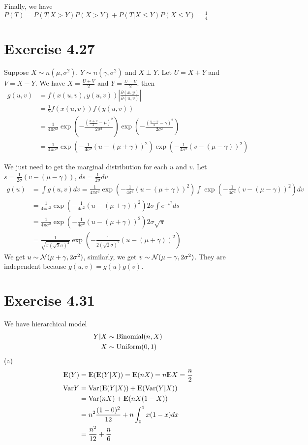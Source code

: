 \documentclass[12pt]{article}
\begin{document}
Finally, we have $P(T) = P(T | X > Y) P(X > Y) + P(T | X \leq Y) P( X \leq Y) = \frac{1}{4}$

\section*{Exercise 4.27}
Suppose $X \sim n(\mu, \sigma^2)$,  $Y \sim n(\gamma, \sigma^2)$ and $X \perp Y$.  Let $U = X + Y$ and $V = X - Y$. We have $X = \frac{U + V}{2}$ and $Y = \frac{U - V}{2}$. then $$\begin{aligned}
g(u, v) &= f(x(u, v), y(u, v)) \left|\frac{\partial(x,y)}{\partial(u,v)}\right| \\
&= \frac{1}{2} f(x(u, v))f(y(u, v))  \\
&= \frac{1}{4\pi \sigma^2} \exp(-\frac{(\frac{u + v}{2} - \mu)^2}{2\sigma^2})\exp(-\frac{(\frac{u - v}{2} - \gamma)^2}{2\sigma^2}) \\
&= \frac{1}{4\pi \sigma^2} \exp(-\frac{1}{4 \sigma^2}(u -(\mu + \gamma))^2)  \exp(-\frac{1}{4\sigma^2}(v - (\mu - \gamma))^2) 
\end{aligned}$$

We just need to get the marginal distribution for each $u$ and $v$. Let $s = \frac{1}{2\sigma}(v - (\mu - \gamma))$,  $ds = \frac{1}{2\sigma}dv$
$$\begin{aligned}
	g(u) &= \int g(u, v) dv = \frac{1}{4\pi \sigma^2} \exp(-\frac{1}{4 \sigma^2}(u -(\mu + \gamma))^2) \int  \exp(-\frac{1}{4\sigma^2}(v - (\mu - \gamma))^2) dv \\
	&=  \frac{1}{4\pi \sigma^2} \exp(-\frac{1}{4 \sigma^2}(u -(\mu + \gamma))^2) 2\sigma \int  e^{-s^2}  ds \\
	&=  \frac{1}{4\pi \sigma^2} \exp(-\frac{1}{4 \sigma^2}(u -(\mu + \gamma))^2) 2\sigma \sqrt{\pi} \\
	&=  \frac{1}{\sqrt{\pi (\sqrt{2}\sigma)^2}} \exp(-\frac{1}{2 (\sqrt{2}\sigma)^2}(u -(\mu + \gamma))^2)
\end{aligned}$$
We get $u \sim \mathcal{N}(\mu + \gamma, 2\sigma^2)$, similarly, we get $v \sim \mathcal{N}(\mu - \gamma, 2\sigma^2)$. They are independent because $g(u,v) = g(u)g(v)$.

\section*{Exercise 4.31}
We have hierarchical model 
$$ \begin{aligned}
Y|X &\sim \mathrm{Binomial} (n, X) \\
X &\sim \mathrm{Uniform}(0,1)
\end{aligned}
$$
(a)
$$ \begin{aligned}
\E(Y)&= \E(\E(Y|X)) = \E(nX) = n \E X = \frac{n}{2} \\
\Var Y &= \Var (\E(Y|X)) + \E(\Var (Y|X)) \\
       &= \Var (nX) + \E (nX(1-X))  \\
       &=  n^2 \frac{(1-0)^2}{12}  + n \int^1_0 x(1-x) dx \\
       &= \frac{n^2}{12} + \frac{n}{6}
\end{aligned}
$$
\end{document}
